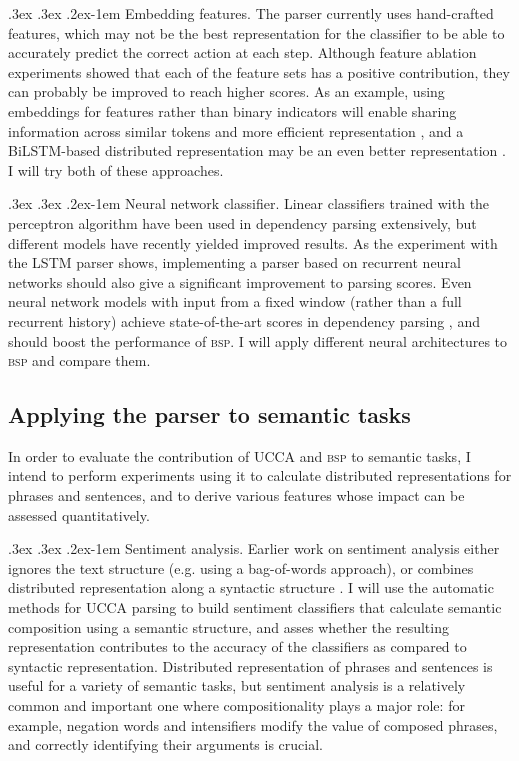 \documentclass[12pt]{article}
\makeatletter
\renewcommand{\paragraph}{
  \@startsection{paragraph}{4}
  {\z@}{.3ex \@plus .3ex \@minus .2ex}{-1em}
  {\normalfont\normalsize\bfseries}
}
\makeatother
\begin{document}
\paragraph{Embedding features.}
The parser currently uses hand-crafted features, which may not be the best
representation for the classifier to be able to accurately predict the correct action
at each step. Although feature ablation experiments showed that each of the feature
sets has a positive contribution, they can probably be improved to reach higher scores.
As an example, using embeddings for features rather than binary
indicators will enable sharing information across similar tokens and more efficient
representation \cite{chen2014fast},
and a BiLSTM-based distributed representation may be an even better representation
\cite{kiperwasser2016simple}.
I will try both of these approaches.

\paragraph{Neural network classifier.}
Linear classifiers trained with the perceptron algorithm have been used in
dependency parsing extensively, but different models have recently yielded improved
results.
As the experiment with the LSTM parser shows, implementing a parser
based on recurrent neural networks should also give a significant improvement to
parsing scores.
Even neural network models with input from a fixed window (rather than a full recurrent
history) achieve state-of-the-art scores in dependency parsing
\cite{chen2014fast,andor2016globally}, and should boost the performance of \textsc{bsp}.
I will apply different neural architectures to \textsc{bsp} and compare them.

\subsection{Applying the parser to semantic tasks}\label{sec:semantic_tasks}
In order to evaluate the contribution of UCCA and \textsc{bsp} to semantic tasks,
I intend to perform experiments using it to calculate distributed representations for
phrases and sentences, and to derive various features whose impact can be assessed quantitatively.

\paragraph{Sentiment analysis.}
Earlier work on sentiment analysis either ignores the text structure (e.g. using a bag-of-words approach), or
combines distributed representation along a syntactic structure \cite{socher2013recursive}.
I will use the automatic methods for UCCA parsing to build sentiment classifiers that calculate semantic composition
using a semantic structure, and asses whether the resulting representation contributes to the accuracy of the
classifiers as compared to syntactic representation.
Distributed representation of phrases and sentences is useful for a variety of semantic tasks,
but sentiment analysis is a relatively common and important one where compositionality plays a major role:
for example, negation words and intensifiers modify the value of composed phrases, and correctly identifying
their arguments is crucial.
\end{document}
